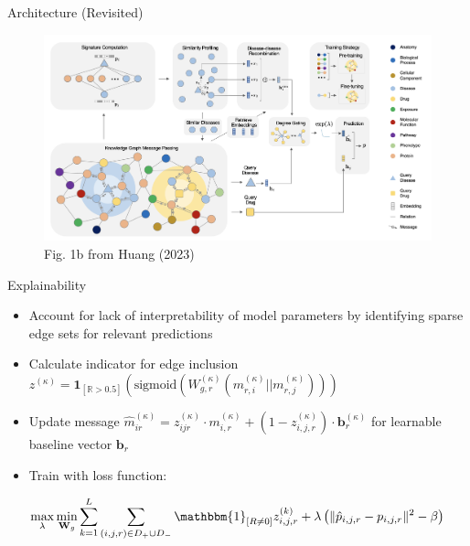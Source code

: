 \documentclass{beamer}
\newcommand{\iter}{\kappa}
\newcommand{\Ind}{\mathbbm{1}}
\begin{document}
\begin{frame}{Architecture (Revisited)}
    \begin{figure}
        \centering
        \includegraphics[scale=0.4]{TxGNN_Arch.png}
        \caption{Fig. 1b from Huang (2023) \cite{huang_zero-shot_2023}}
    \end{figure}
\end{frame}

\begin{frame}{Explainability}
    \begin{itemize}
        \item Account for lack of interpretability of model parameters by identifying sparse edge sets for relevant predictions 
        \item Calculate indicator for edge inclusion $z^{(\iter)} = \mathbf{1}_{[\mathbb{R}>0.5]}
        \left( 
            \text{sigmoid}
            \left( 
                W_{g,r}^{(\iter)}(m_{r,i}^{(\iter)}||m_{r,j}^{(\iter)})
            \right)
        \right)$
        \item Update message $\hat{m}_{ir}^{(\iter)} = z_{ijr}^{(\iter)} \cdot m_{i,r}^{(\iter)} + (1-z_{i,j,r}^{(\iter)})\cdot \mathbf{b}_r^{(\iter)}$ for learnable baseline vector $\mathbf{b}_r$
        \item Train with loss function: \\ 
\end{itemize}
\[
    \max_\lambda \min_{\mathbf{W}_g}  
    \sum_{k=1}^L \sum_{(i,j,r) \in D_{+} \cup D_{-}} 
    \Ind_{[R \neq 0]}z^{(k)}_{i,j,r} 
    + 
    \lambda \left( \lVert \hat{p}_{i,j,r} - p_{i,j,r} \rVert^2 - \beta\right) 
    \]

\end{frame}
\end{document}
